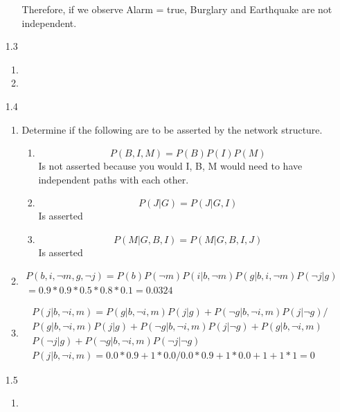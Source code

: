 \documentclass[letterpaper, 12pt]{article}
\begin{document}
\begin{enumerate}
\begin{enumerate}
                  Therefore, if we observe Alarm = true, Burglary and Earthquake are not independent.
        \end{enumerate}
    \item[1.3]
        \begin{enumerate}
            \item
            \item
        \end{enumerate}
    \item[1.4]
        \begin{enumerate}
            \item Determine if the following are to be asserted by the network structure.
                  \begin{enumerate}
                      \item \[P(B,I,M)=P(B)P(I)P(M)\] Is not asserted because you would I, B, M would need to have independent paths with each other.
                      \item \[P(J|G) = P(J|G,I)\] Is asserted
                      \item \[P(M|G,B,I) = P(M|G,B,I,J)\] Is asserted
                  \end{enumerate}
            \item
                  \begin{gather*}
                      P(b,i,\neg m, g, \neg j) = P(b)P(\neg m) P(i|b, \neg m) P(g|b,i, \neg m) P(\neg j|g) \\
                      = 0.9*0.9*0.5*0.8*0.1 = 0.0324
                  \end{gather*}
            \item
                  \begin{gather*}
                      P(j|b,\neg i,m)=P(g|b, \neg i, m)P(j|g)+P(\neg g|b, \neg i, m)P(j|\neg g)/ \\
                      P(g|b, \neg i, m)P(j|g) + P(\neg g|b, \neg i,m)P(j|\neg g) + P(g|b, \neg i, m) \\
                      P(\neg j|g)+P(\neg g|b, \neg i, m)P(\neg j|\neg g)\\
                      P(j|b, \neg i, m) = 0.0*0.9+1*0.0/0.0*0.9+1*0.0+1+1*1 = 0
                  \end{gather*}
        \end{enumerate}
    \item[1.5]
        \begin{enumerate}
            \item

\end{enumerate}
\end{enumerate}
\end{document}

